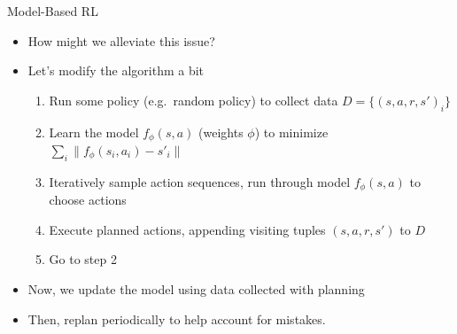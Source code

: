 \begin{frame}{Model-Based RL}
\begin{itemize}
    \item How might we alleviate this issue?
    \item Let's modify the algorithm a bit
    \begin{enumerate}
        \item Run some policy (e.g.\ random policy) to collect data
              $D = \{(s, a, r, s')_i\}$
        \item Learn the model $f_\phi(s, a)$ (weights $\phi$) to minimize
              $\sum_i \lVert f_\phi(s_i, a_i) - s'_i \rVert$
        \item Iteratively sample action sequences, run through model $f_\phi(s, a)$ to
              choose actions
        \item Execute planned actions, appending visiting tuples $(s, a, r, s')$ to $D$
        \item Go to step 2
    \end{enumerate}
    \item Now, we update the model using data collected with planning
    \item Then, replan periodically to help account for mistakes.
\end{itemize}
\end{frame}
